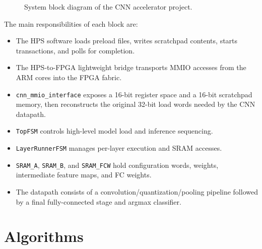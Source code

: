 \documentclass[11pt]{article}
\begin{document}
\begin{figure}[H]
\caption{System block diagram of the CNN accelerator project.}
\label{fig:system-block-diagram}
\end{figure}

The main responsibilities of each block are:
\begin{itemize}
\item The HPS software loads preload files, writes scratchpad contents, starts
transactions, and polls for completion.
\item The HPS-to-FPGA lightweight bridge transports MMIO accesses from the ARM
cores into the FPGA fabric.
\item \texttt{cnn\_mmio\_interface} exposes a 16-bit register space and a
16-bit scratchpad memory, then reconstructs the original 32-bit load words
needed by the CNN datapath.
\item \texttt{TopFSM} controls high-level model load and inference sequencing.
\item \texttt{LayerRunnerFSM} manages per-layer execution and SRAM accesses.
\item \texttt{SRAM\_A}, \texttt{SRAM\_B}, and \texttt{SRAM\_FCW} hold
configuration words, weights, intermediate feature maps, and FC weights.
\item The datapath consists of a convolution/quantization/pooling pipeline
followed by a final fully-connected stage and argmax classifier.
\end{itemize}

\section{Algorithms}
\end{document}

